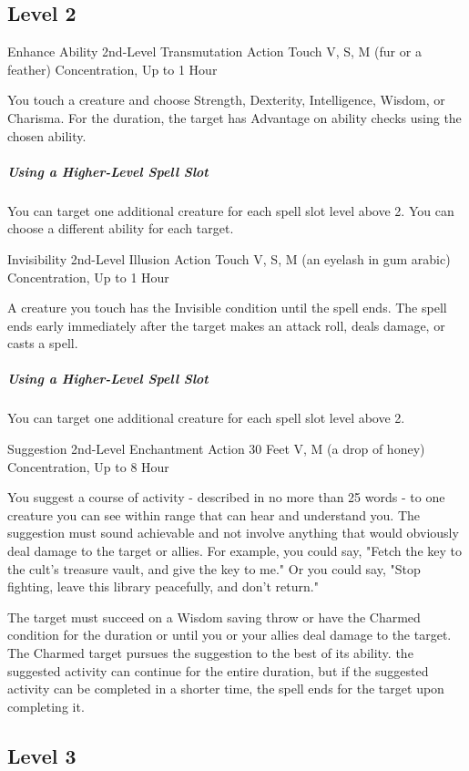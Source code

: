 \documentclass[letterpaper,openany,oneside,twocolumn]{book}
\begin{document}
\subsection*{Level 2}

\DndSpellHeader
  {Enhance Ability}
  {2nd-Level Transmutation}
  {Action}
  {Touch}
  {V, S, M (fur or a feather)}
  {Concentration, Up to 1 Hour}

You touch a creature and choose Strength, Dexterity, Intelligence, Wisdom, or Charisma. For the duration, the target has Advantage on ability checks using the chosen ability.

\subparagraph*{Using a Higher-Level Spell Slot} You can target one additional creature for each spell slot level above 2. You can choose a different ability for each target.

\DndSpellHeader
  {Invisibility}
  {2nd-Level Illusion}
  {Action}
  {Touch}
  {V, S, M (an eyelash in gum arabic)}
  {Concentration, Up to 1 Hour}

A creature you touch has the Invisible condition until the spell ends. The spell ends early immediately after the target makes an attack roll, deals damage, or casts a spell.

\subparagraph*{Using a Higher-Level Spell Slot} You can target one additional creature for each spell slot level above 2.

\DndSpellHeader
  {Suggestion}
  {2nd-Level Enchantment}
  {Action}
  {30 Feet}
  {V, M (a drop of honey)}
  {Concentration, Up to 8 Hour}

You suggest a course of activity - described in no more than 25 words - to one creature you can see within range that can hear and understand you. The suggestion must sound achievable and not involve anything that would obviously deal damage to the target or allies. For example, you could say, "Fetch the key to the cult's treasure vault, and give the key to me." Or you could say, "Stop fighting, leave this library peacefully, and don't return."

The target must succeed on a Wisdom saving throw or have the Charmed condition for the duration or until you or your allies deal damage to the target. The Charmed target pursues the suggestion to the best of its ability. the suggested activity can continue for the entire duration, but if the suggested activity can be completed in a shorter time, the spell ends for the target upon completing it.

\subsection*{Level 3}
\end{document}

